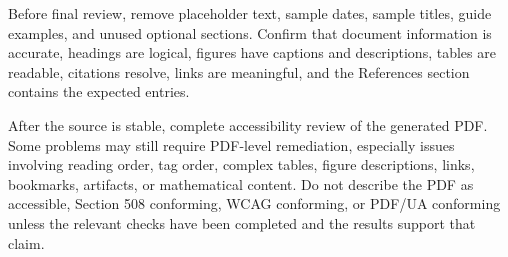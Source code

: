 Before final review, remove placeholder text, sample dates, sample titles, guide examples, and unused optional sections. Confirm that document information is accurate, headings are logical, figures have captions and descriptions, tables are readable, citations resolve, links are meaningful, and the References section contains the expected entries.

After the source is stable, complete accessibility review of the generated PDF. Some problems may still require PDF-level remediation, especially issues involving reading order, tag order, complex tables, figure descriptions, links, bookmarks, artifacts, or mathematical content. Do not describe the PDF as accessible, Section 508 conforming, WCAG conforming, or PDF/UA conforming unless the relevant checks have been completed and the results support that claim.
